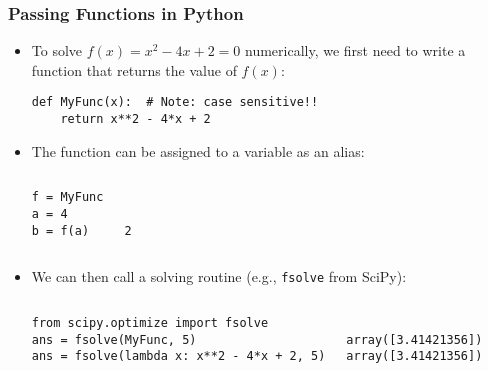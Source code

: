 \begin{frame}[fragile]
  \frametitle{Passing Functions in Python}

  \begin{itemize}
    \item To solve \( f(x) = x^2 - 4x + 2 = 0 \) numerically, we first need to write a function that returns the value of \( f(x) \):
          \begin{lstlisting}
def MyFunc(x):  # Note: case sensitive!!
    return x**2 - 4*x + 2
      \end{lstlisting}
    \item The function can be assigned to a variable as an alias:
    \begin{columns}[T]
      \begin{lstlisting}
f = MyFunc
a = 4
b = f(a)
      \end{lstlisting}    
      \begin{lstlisting}[style=PyOutput]


2
      \end{lstlisting}
    \end{columns}
    \item We can then call a solving routine (e.g., \lstinline|fsolve| from SciPy):
    \begin{columns}[T]
      \begin{lstlisting}
from scipy.optimize import fsolve
ans = fsolve(MyFunc, 5)
ans = fsolve(lambda x: x**2 - 4*x + 2, 5)
      \end{lstlisting}
      \begin{lstlisting}[style=PyOutput]

array([3.41421356])
array([3.41421356])
        \end{lstlisting}
    \end{columns}
  \end{itemize}
\end{frame}

